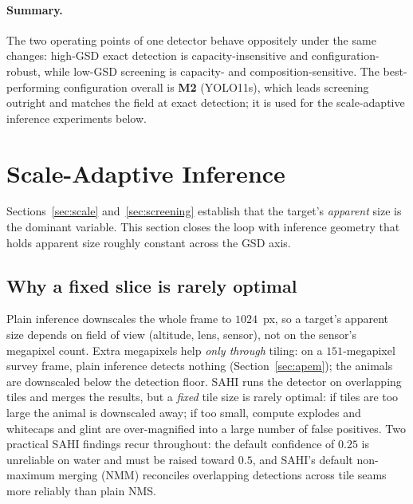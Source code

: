 \documentclass[11pt,a4paper]{article}
\newcommand{\imgsz}{1024}
\begin{document}
\paragraph{Summary.}
The two operating points of one detector behave oppositely under the same
changes: high-GSD exact detection is capacity-insensitive and
configuration-robust, while low-GSD screening is capacity- and
composition-sensitive. The best-performing configuration overall is
\textbf{M2} (YOLO11s), which leads screening outright and matches the field at
exact detection; it is used for the scale-adaptive inference experiments below.

\section{Scale-Adaptive Inference}\label{sec:inference}
Sections~\ref{sec:scale} and~\ref{sec:screening} establish that the target's
\emph{apparent} size is the dominant variable. This section closes the loop with
inference geometry that holds apparent size roughly constant across the GSD axis.

\subsection{Why a fixed slice is rarely optimal}
Plain inference downscales the whole frame to $\imgsz$~px, so a target's apparent
size depends on field of view (altitude, lens, sensor), not on the sensor's
megapixel count. Extra megapixels help \emph{only through} tiling: on a
$151$-megapixel survey frame, plain inference detects nothing
(Section~\ref{sec:apem}); the animals are downscaled below the detection floor.
SAHI \citep{akyon2022sahi} runs the detector on overlapping tiles and merges the
results, but a \emph{fixed} tile size is rarely optimal: if tiles are too large
the animal is downscaled away; if too small, compute explodes and whitecaps and
glint are over-magnified into a large number of false positives. Two practical SAHI
findings recur throughout: the default confidence of $0.25$ is unreliable on water
and must be raised toward $0.5$, and SAHI's default non-maximum merging (NMM)
reconciles overlapping detections across tile seams more reliably than plain NMS.
\end{document}
